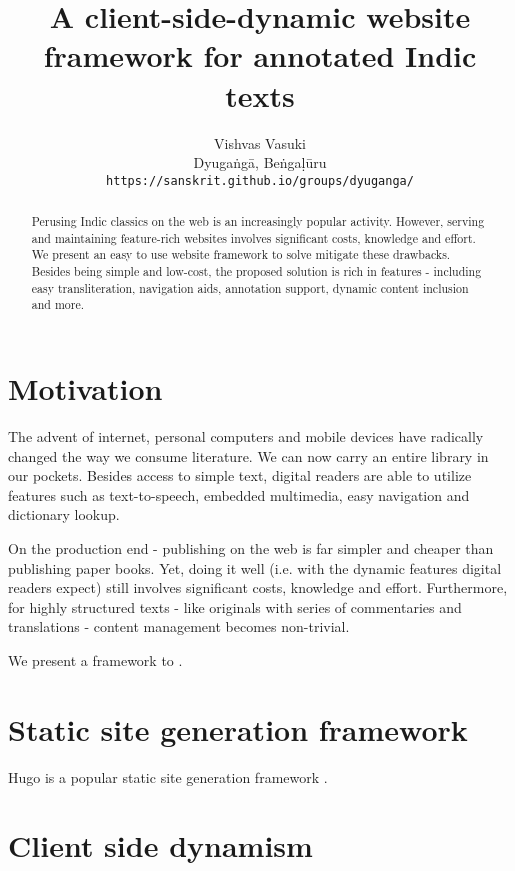 \documentclass[11pt]{article}
\title{A client-side-dynamic website framework for annotated Indic texts}
\author{
  Vishvas Vasuki \\
  Dyugaṅgā, Beṅgaḷūru \\
  {\tt https://sanskrit.github.io/groups/dyuganga/}
\\}
\date{}
\begin{document}
\maketitle
\begin{abstract}
Perusing Indic classics on the web is an increasingly popular activity. However, serving and maintaining feature-rich websites involves significant costs, knowledge and effort. We present an easy to use website framework to solve mitigate these drawbacks. Besides being simple and low-cost, the proposed solution is rich in features - including easy transliteration, navigation aids, annotation support, dynamic content inclusion and more.
\end{abstract}

\section{Motivation}
The advent of internet, personal computers and mobile devices have radically changed the way we consume literature. We can now carry an entire library in our pockets. Besides access to simple text, digital readers are able to utilize features such as text-to-speech, embedded multimedia, easy navigation and dictionary lookup. 

On the production end - publishing on the web is far simpler and cheaper than publishing paper books. Yet, doing it well (i.e. with the dynamic features digital readers expect) still involves significant costs, knowledge and effort. Furthermore, for highly structured texts - like originals with series of commentaries and translations - content management becomes non-trivial.

We present a framework to .

\section{Static site generation framework}
Hugo is a popular static site generation framework \cite{hugo}.

\section{Client side dynamism}




\end{document}
